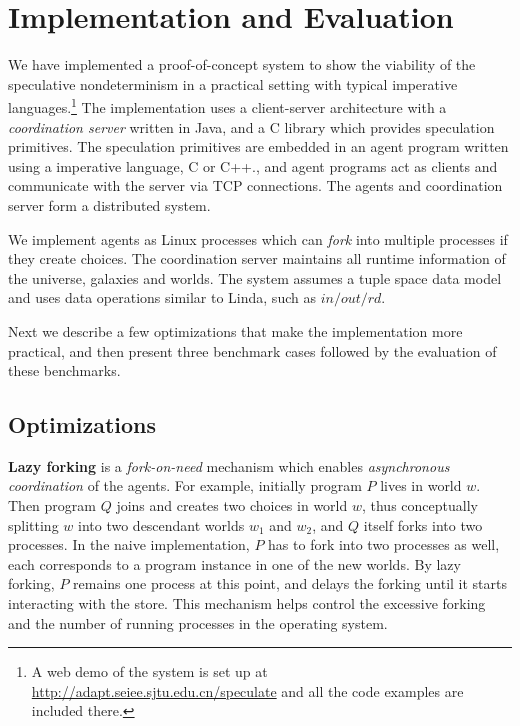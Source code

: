 \section{Implementation and Evaluation}\label{sec:experiment}


We have implemented a proof-of-concept system to show the viability of 
the speculative nondeterminism in a practical setting with typical
imperative languages.\footnote{A web demo of the system is
set up at \url{http://adapt.seiee.sjtu.edu.cn/speculate} and
all the code examples are included there.}
The implementation uses a client-server architecture with
a \emph{coordination server} written in 
Java, and a C library which provides speculation primitives.
The speculation primitives are embedded in an agent program
written using a imperative language, C or C++., and 
agent programs act as clients and communicate with the server 
via TCP connections.
The agents and coordination server form a distributed system.

We implement agents as Linux processes which can \emph{fork} 
into multiple processes if they create choices.
The coordination server maintains all runtime information of 
the universe, galaxies and worlds.
The system assumes a tuple space data model and uses data
operations similar to Linda, such as $in/out/rd$.

Next we describe a few optimizations that make the implementation
more practical, and then present three benchmark cases followed by
the evaluation of these benchmarks.

\subsection{Optimizations}

{\bf Lazy forking} is a \emph{fork-on-need} mechanism which enables 
\emph{asynchronous coordination} of the agents.
For example, initially program $P$ lives in world $w$. 
Then program $Q$ joins and creates two choices in world $w$, 
thus conceptually splitting $w$ into two descendant worlds $w_1$ and $w_2$,
and $Q$ itself forks into two processes.
In the naive implementation, $P$ has to fork into two processes as well,
each corresponds to a program instance in one of the new worlds.
By lazy forking, $P$ remains one process at this point, 
and delays the forking until it starts interacting with the store.
This mechanism helps control the excessive forking and the number of
running processes in the operating system.

